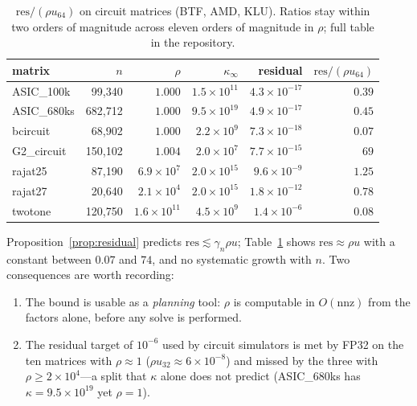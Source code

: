 \begin{table}[t]
  \centering
  \small
  \caption{$\mathrm{res}/(\rho u_{64})$ on circuit matrices (BTF, AMD, KLU).
  Ratios stay within two orders of magnitude across eleven orders of magnitude
  in $\rho$; full table in the repository.}
  \label{tab:res}
  \begin{tabular}{lrrrrr}
    \toprule
    matrix & $n$ & $\rho$ & $\kappa_\infty$ & residual & $\mathrm{res}/(\rho u_{64})$ \\
    \midrule
    ASIC\_100k  & 99{,}340  & $1.000$ & $1.5\times10^{11}$ & $4.3\times10^{-17}$ & $0.39$ \\
    ASIC\_680ks & 682{,}712 & $1.000$ & $9.5\times10^{19}$ & $4.9\times10^{-17}$ & $0.45$ \\
    bcircuit    & 68{,}902  & $1.000$ & $2.2\times10^{9}$  & $7.3\times10^{-18}$ & $0.07$ \\
    G2\_circuit & 150{,}102 & $1.004$ & $2.0\times10^{7}$  & $7.7\times10^{-15}$ & $69$ \\
    rajat25     & 87{,}190  & $6.9\times10^{7}$ & $2.0\times10^{15}$ & $9.6\times10^{-9}$ & $1.25$ \\
    rajat27     & 20{,}640  & $2.1\times10^{4}$ & $2.0\times10^{15}$ & $1.8\times10^{-12}$ & $0.78$ \\
    twotone     & 120{,}750 & $1.6\times10^{11}$ & $4.5\times10^{9}$ & $1.4\times10^{-6}$ & $0.08$ \\
    \bottomrule
  \end{tabular}
\end{table}

Proposition~\ref{prop:residual} predicts $\mathrm{res}\lesssim\gamma_n\rho u$;
Table~\ref{tab:res} shows $\mathrm{res}\approx\rho u$ with a constant between
$0.07$ and $74$, and no systematic growth with $n$. Two consequences are worth
recording:
\begin{enumerate}
  \item The bound is usable as a \emph{planning} tool: $\rho$ is computable in
        $O(\mathrm{nnz})$ from the factors alone, before any solve is performed.
  \item The residual target of $10^{-6}$ used by circuit simulators is met by
        FP32 on the ten matrices with $\rho\approx1$ ($\rho u_{32}\approx6\times10^{-8}$)
        and missed by the three with $\rho\ge2\times10^{4}$---a split that
        $\kappa$ alone does not predict (ASIC\_680ks has $\kappa=9.5\times10^{19}$
        yet $\rho=1$).
\end{enumerate}

